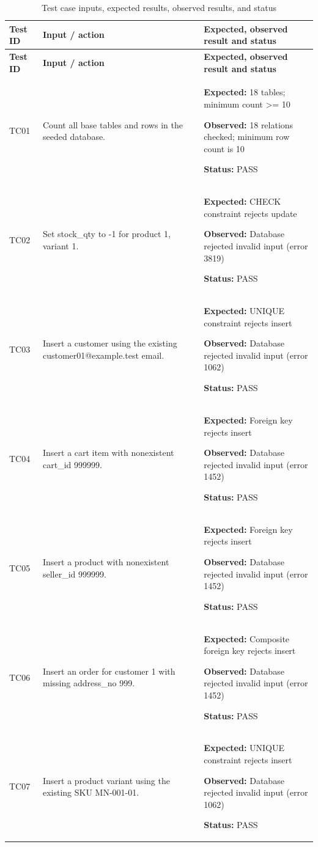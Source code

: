 \documentclass[11pt,a4paper,oneside]{report}
\begin{document}
\begin{longtable}{@{}P{13mm}P{51mm}P{92mm}@{}}
\caption{Test case inputs, expected results, observed results, and status}\label{tab:testcases}\\
\toprule
\textbf{Test ID} & \textbf{Input / action} & \textbf{Expected, observed result and status}\\\midrule
\endfirsthead
\toprule
\textbf{Test ID} & \textbf{Input / action} & \textbf{Expected, observed result and status}\\\midrule
\endhead
\bottomrule
\endfoot
TC01 & Count all base tables and rows in the seeded database. & \textbf{Expected:} 18 tables; minimum count >= 10\par\textbf{Observed:} 18 relations checked; minimum row count is 10\par\textbf{Status:} PASS \\
TC02 & Set stock\_qty to -1 for product 1, variant 1. & \textbf{Expected:} CHECK constraint rejects update\par\textbf{Observed:} Database rejected invalid input (error 3819)\par\textbf{Status:} PASS \\
TC03 & Insert a customer using the existing customer01@example.test email. & \textbf{Expected:} UNIQUE constraint rejects insert\par\textbf{Observed:} Database rejected invalid input (error 1062)\par\textbf{Status:} PASS \\
TC04 & Insert a cart item with nonexistent cart\_id 999999. & \textbf{Expected:} Foreign key rejects insert\par\textbf{Observed:} Database rejected invalid input (error 1452)\par\textbf{Status:} PASS \\
TC05 & Insert a product with nonexistent seller\_id 999999. & \textbf{Expected:} Foreign key rejects insert\par\textbf{Observed:} Database rejected invalid input (error 1452)\par\textbf{Status:} PASS \\
TC06 & Insert an order for customer 1 with missing address\_no 999. & \textbf{Expected:} Composite foreign key rejects insert\par\textbf{Observed:} Database rejected invalid input (error 1452)\par\textbf{Status:} PASS \\
TC07 & Insert a product variant using the existing SKU MN-001-01. & \textbf{Expected:} UNIQUE constraint rejects insert\par\textbf{Observed:} Database rejected invalid input (error 1062)\par\textbf{Status:} PASS \\

\end{longtable}
\end{document}
